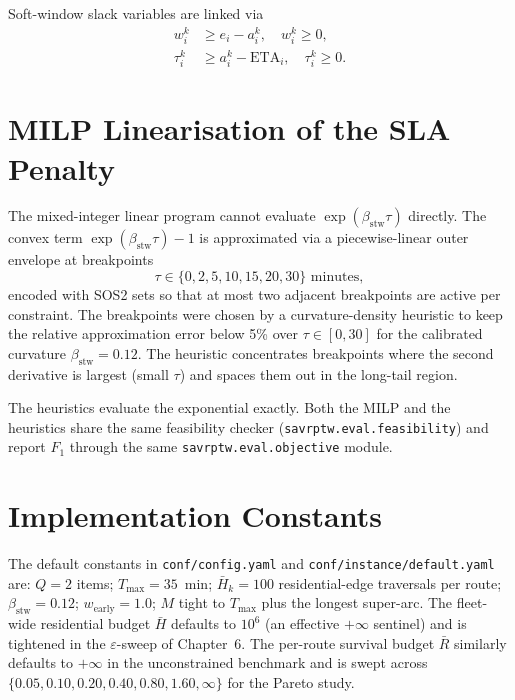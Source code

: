 Soft-window slack variables are linked via
\begin{align}
    w_i^k &\geq e_i - a_i^k, \quad w_i^k \geq 0, \label{eq:early} \\
    \tau_i^k &\geq a_i^k - \mathrm{ETA}_i, \quad \tau_i^k \geq 0. \label{eq:late}
\end{align}

\section{MILP Linearisation of the SLA Penalty}
\label{ch3:pwl}

The mixed-integer linear program cannot evaluate
$\exp(\beta_{\text{stw}}\tau)$ directly. The convex term
$\exp(\beta_{\text{stw}}\tau) - 1$ is approximated via a
piecewise-linear outer envelope at breakpoints
\[
    \tau \in \{0, 2, 5, 10, 15, 20, 30\} \text{ minutes},
\]
encoded with SOS2 sets so that at most two adjacent breakpoints are
active per constraint. The breakpoints were chosen by a
curvature-density heuristic to keep the relative approximation error
below 5\% over $\tau \in [0, 30]$ for the calibrated curvature
$\beta_{\text{stw}} = 0.12$. The heuristic concentrates breakpoints
where the second derivative is largest (small $\tau$) and spaces them
out in the long-tail region.

The heuristics evaluate the exponential exactly. Both the MILP and
the heuristics share the same feasibility checker
(\texttt{savrptw.eval.feasibility}) and report $F_1$ through the same
\texttt{savrptw.eval.objective} module.

\section{Implementation Constants}

The default constants in
\texttt{conf/config.yaml} and \texttt{conf/instance/default.yaml} are:
$Q = 2$ items;
$T_{\max} = 35$~min;
$\bar{H}_k = 100$ residential-edge traversals per route;
$\beta_{\text{stw}} = 0.12$;
$w_{\text{early}} = 1.0$;
$M$ tight to $T_{\max}$ plus the longest super-arc.
The fleet-wide residential budget $\bar{H}$ defaults to $10^6$
(an effective $+\infty$ sentinel) and is tightened in the
$\varepsilon$-sweep of Chapter~6. The per-route survival budget
$\bar{R}$ similarly defaults to $+\infty$ in the unconstrained
benchmark and is swept across $\{0.05, 0.10, 0.20, 0.40, 0.80, 1.60,
\infty\}$ for the Pareto study.
